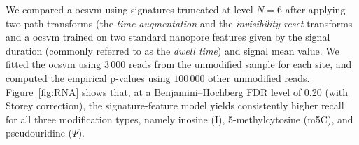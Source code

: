 We compared a \acrshort{ocsvm} using signatures truncated at level $N=6$ after applying two path transforms (the \emph{time augmentation} and the \emph{invisibility-reset} transforms \citep{lyons2025signature} and a \acrshort{ocsvm} trained on two standard nanopore features given by the signal duration (commonly referred to as the \emph{dwell time}) and signal mean value. We fitted the \acrshort{ocsvm} using $3\,000$ reads from the unmodified sample for each site, and computed the empirical p-values using $100\,000$ other unmodified reads. Figure~\ref{fig:RNA} shows that, at a Benjamini–Hochberg FDR level of 0.20 (with Storey correction), the signature-feature model yields consistently higher recall for all three modification types, namely inosine (I), 5-methylcytosine (m5C), and pseudouridine ($\Psi$).



